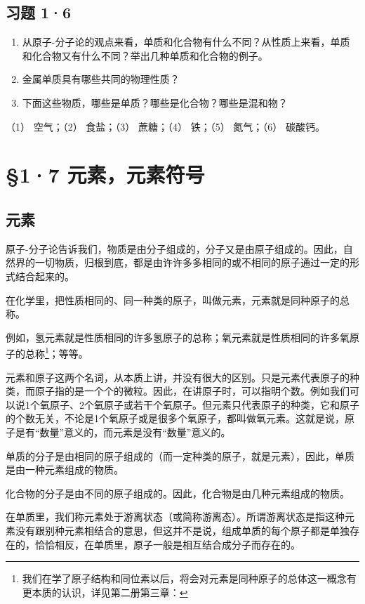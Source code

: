 \subsection{习题 1·6}

\begin{enumerate}
\item
  从原子-分子论的观点来看，单质和化合物有什么不同？从性质上来看，单质和化合物又有什么不同？举出几种单质和化合物的例子。
\item
  金属单质具有哪些共同的物理性质？
\item
  下面这些物质，哪些是单质？哪些是化合物？哪些是混和物？
\end{enumerate}

（1） 空气；（2） 食盐；（3） 蔗糖；（4） 铁；（5） 氮气；（6） 碳酸钙。

\section{§1·7 元素，元素符号}

\subsection{元素}

原子-分子论告诉我们，物质是由分子组成的，分子又是由原子组成的。因此，自然界的一切物质，归根到底，都是由许许多多相同的或不相同的原子通过一定的形式结合起来的。

在化学里，把性质相同的、同一种类的原子，叫做元素，元素就是同种原子的总称。

例如，氢元素就是性质相同的许多氢原子的总称；氧元素就是性质相同的许多氧原子的总称\footnote{我们在学了原子结构和同位素以后，将会对元素是同种原子的总体这一概念有更本质的认识，详见第二册第三章：}；等等。

元素和原子这两个名词，从本质上讲，并没有很大的区别。只是元素代表原子的种类，而原子指的是一个个的微粒。因此，在讲原子时，可以指明个数。例如我们可以说1个氧原子、2个氧原子或若干个氧原子。但元素只代表原子的种类，它和原子的个数无关，不论是1个氧原子或是很多个氧原子，都叫做氧元素。这就是说，原子是有``数量''意义的，而元素是没有``数量''意义的。

单质的分子是由相同的原子组成的（而一定种类的原子，就是元素），因此，单质是由一种元素组成的物质。

化合物的分子是由不同的原子组成的。因此，化合物是由几种元素组成的物质。

在单质里，我们称元素处于游离状态（或简称游离态）。所谓游离状态是指这种元素没有跟别种元素相结合的意思，但这并不是说，组成单质的每个原子都是单独存在的，恰恰相反，在单质里，原子一般是相互结合成分子而存在的。

